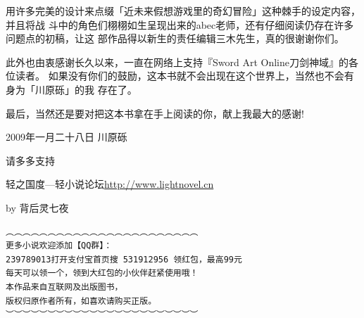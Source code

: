 \documentclass[11pt]{book}
\begin{document}
用许多完美的设计来点缀「近未来假想游戏里的奇幻冒险」这种棘手的设定内容，并且将战
斗中的角色们栩栩如生呈现出来的abec老师，还有仔细阅读仍存在许多问题点的初稿，让这
部作品得以新生的责任编辑三木先生，真的很谢谢你们。

此外也由衷感谢长久以来，一直在网络上支持『Sword Art Online刀剑神域』的各位读者。
如果没有你们的鼓励，这本书就不会出现在这个世界上，当然也不会有身为「川原砾」的我
存在了。

最后，当然还是要对把这本书拿在手上阅读的你，献上我最大的感谢!

2009年一月二十八日 川原砾

请多多支持

轻之国度—轻小说论坛\url{http://www.lightnovel.cn}

by 背后灵七夜

\begin{verbatim}
︵︵︵︵︵︵︵︵︵︵︵︵︵︵︵︵︵︵︵︵︵︵︵
更多小说欢迎添加【QQ群】：
239789013打开支付宝首页搜 531912956 领红包，最高99元
每天可以领一个，领到大红包的小伙伴赶紧使用哦！
本作品来自互联网及出版图书，
版权归原作者所有，如喜欢请购买正版。
︶︶︶︶︶︶︶︶︶︶︶︶︶︶︶︶︶︶︶︶︶︶︶
\end{verbatim}
\end{document}
